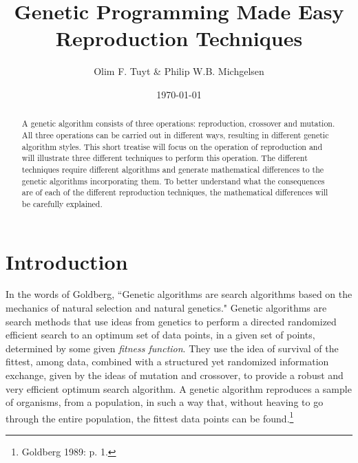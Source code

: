 \documentclass[a4paper]{article}
\title{\normalsize{Genetic Programming Made Easy}\\ \huge{Reproduction Techniques}}
\author{Olim F. Tuyt \& Philip W.B. Michgelsen}
\date{\today}
\theoremstyle{dotless}
\begin{document}
\maketitle
\thispagestyle{fancy} 

\begin{abstract}
\noindent A genetic algorithm consists of three operations: reproduction, crossover and mutation. All three operations can be carried out in different ways, resulting in different genetic algorithm styles. This short treatise will focus on the operation of reproduction and will illustrate three different techniques to perform this operation. The different techniques require different algorithms and generate mathematical differences to the genetic algorithms incorporating them. To better understand what the consequences are of each of the different reproduction techniques, the mathematical differences will be carefully explained.
\end{abstract}

\section{Introduction}

In the words of Goldberg, ``Genetic algorithms are search algorithms based on the mechanics of natural selection and natural genetics." Genetic algorithms are search methods that use ideas from genetics to perform a directed randomized efficient search to an optimum set of data points, in a given set of points, determined by some given \emph{fitness function}. They use the idea of survival of the fittest, among data, combined  with a structured yet randomized information exchange, given by the ideas of mutation and crossover, to provide a robust and very efficient optimum search algorithm. A genetic algorithm reproduces a sample of organisms, from a population, in such a way that, without heaving to go through the entire population, the fittest data points can be found.\footnote{Goldberg 1989: p. 1.} \\
\end{document}
